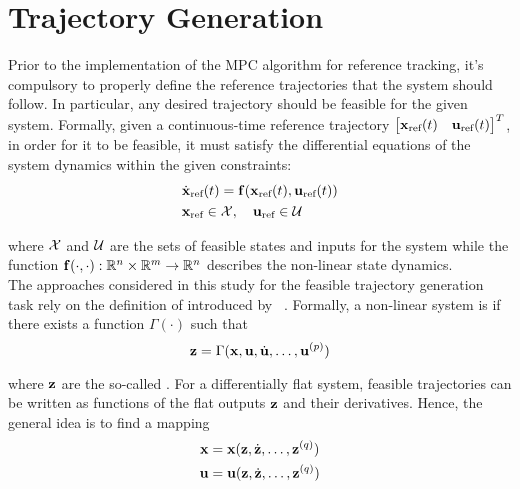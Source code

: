 \documentclass[../main.tex]{subfiles}
\begin{document}
\section{Trajectory Generation}\label{sec:trajectory-generation}

Prior to the implementation of the MPC algorithm for reference tracking, it's
compulsory to properly define the reference trajectories that the system should
follow. In particular, any desired trajectory should be feasible for the given system.
Formally, given a continuous-time reference trajectory 
$\begin{bmatrix} \mathbf{x}_{\text{ref}}(t) & \mathbf{u}_{\text{ref}}(t) \end{bmatrix}^T$, in order
for it to be feasible, it must satisfy the differential equations of the system
dynamics within the given constraints:
\begin{equation}
	\begin{aligned}
		&\dot{\mathbf{x}}_{\text{ref}}(t) = \mathbf{f}(\mathbf{x}_{\text{ref}}(t), \mathbf{u}_{\text{ref}}(t))\\
		&\mathbf{x}_{\text{ref}} \in \mathcal{X}, \quad \mathbf{u}_{\text{ref}} \in \mathcal{U}
	\end{aligned}
\end{equation}

where $\mathcal{X}$ and $\mathcal{U}$ are the sets of feasible states and inputs for
the system while the function $\mathbf{f}(\cdot, \cdot): \mathbb{R}^n \times \mathbb{R}^m \rightarrow
\mathbb{R}^n$ describes the non-linear state dynamics.\\
The approaches considered in this study for the feasible trajectory generation task rely on the definition of 
introduced by ~\cite{murray}. Formally, a non-linear
system is  if there exists a function $\Gamma(\cdot)$
such that
\begin{equation*}
	\mathbf{z} = \Gamma(\mathbf{x}, \mathbf{u}, \dot{\mathbf{u}}, \ldots, \mathbf{u}^{(p)})
\end{equation*}

where $\mathbf{z}$ are the so-called . For a differentially flat
system, feasible trajectories can be written as functions of the flat outputs
$\mathbf{z}$ and their derivatives. Hence, the general idea is to find a mapping 
\begin{equation*}
	\begin{aligned}
		\mathbf{x} &= \mathbf{x}(\mathbf{z}, \dot{\mathbf{z}}, \ldots, \mathbf{z}^{(q)})\\
		\mathbf{u} &= \mathbf{u}(\mathbf{z}, \dot{\mathbf{z}}, \ldots, \mathbf{z}^{(q)})
	\end{aligned}
\end{equation*}
\end{document}
